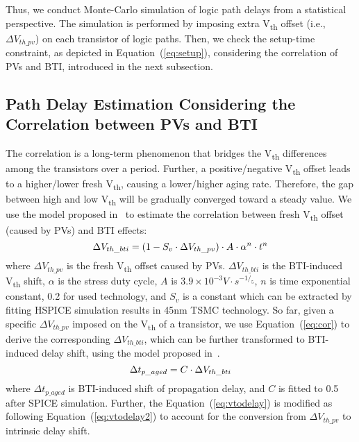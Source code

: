 Thus, we conduct Monte-Carlo simulation of logic path delays from a statistical perspective. The simulation is performed by imposing extra V\textsubscript{th} offset (i.e., $\Delta V_{th\_pv}$) on each transistor of logic paths. Then, we check the setup-time constraint, as depicted in Equation~(\ref{eq:setup}), considering the correlation of PVs and BTI, introduced in the next subsection. 

\subsection{Path Delay Estimation Considering the Correlation between PVs and BTI}
\label{sec:frame:cor}
The correlation is a long-term phenomenon that bridges the V\textsubscript{th} differences among the transistors over a period. Further, a positive/negative V\textsubscript{th} offset leads to a higher/lower fresh V\textsubscript{th}, causing a lower/higher aging rate. Therefore, the gap between high and low V\textsubscript{th} will be gradually converged toward a steady value. We use the model proposed in~\cite{gomez2016early} to estimate the correlation between fresh V\textsubscript{th} offset (caused by PVs) and BTI effects:
\begin{equation}
	\centering
	\fontsize{9}{9} \selectfont
	\Delta V_{th\_bti} = (1 - S_{v} \cdot \Delta V_{th\_pv})  \cdot A \cdot \alpha^n \cdot t^n
	\label{eq:cor}
\end{equation}
where $\Delta V_{th\_pv}$ is the fresh V\textsubscript{th} offset caused by PVs. $\Delta V_{th\_bti}$ is the BTI-induced V\textsubscript{th} shift, $\alpha$ is the stress duty cycle, $A$ is $3.9 \times 10^{-3} V \cdot s^{-1/_5}$, $n$ is time exponential constant, 0.2 for used technology, and $S_{v}$ is a constant which can be extracted by fitting HSPICE simulation results in 45nm TSMC technology. So far, given a specific $\Delta V_{th\_pv}$ imposed on the V\textsubscript{th} of a transistor, we use Equation~(\ref{eq:cor}) to derive the corresponding $\Delta V_{th\_bti}$, which can be further transformed to BTI-induced delay shift, using the model proposed in~\cite{wang2007efficient}.%
\begin{equation}
	\centering
	\fontsize{9}{9} \selectfont
	\Delta t_{p\_aged} = C \cdot \Delta V_{th\_bti}
	\label{eq:vtodelay}
\end{equation}	
where $\Delta t_{p\_aged}$ is BTI-induced shift of propagation delay, and $C$ is fitted to 0.5 after SPICE simulation. Further, the Equation~(\ref{eq:vtodelay}) is modified as following Equation~(\ref{eq:vtodelay2}) to account for the conversion from $\Delta V_{th\_pv}$ to intrinsic delay shift. 

